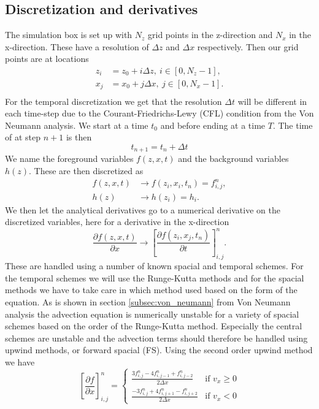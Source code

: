 \subsection{Discretization and derivatives}

The simulation box is set up with $N_z$ grid points in the z-direction and $N_x$ in the x-direction. These have a resolution of $\Delta z$ and $\Delta x$ respectively. Then our grid points are at locations
\begin{align*}
    z_i &= z_0 + i\Delta z,\ i\in[0,N_z-1], \\ 
    x_j &= x_0 + j\Delta x,\ j\in[0,N_x-1].\\ 
\end{align*}
For the temporal discretization we get that the resolution $\Delta t$ will be different in each time-step due to the Courant-Friedrichs-Lewy (CFL) condition from the Von Neumann analysis. We start at a time $t_0$ and before ending at a time $T$. The time of at step $n+1$ is then
\begin{equation*}
    t_{n+1} = t_n + \Delta t
\end{equation*}
We name the foreground variables $f(z,x,t)$ and the background variables $h(z)$. These are then discretized as
\begin{align*}
    f(z,x,t) &\rightarrow f(z_i, x_i, t_n) = f_{i,j}^n,\\
    h(z) &\rightarrow h(z_i) = h_i.
\end{align*}
We then let the analytical derivatives go to a numerical derivative on the discretized variables, here for a derivative in the x-direction
\begin{equation*}
    \frac{\partial f(z,x,t)}{\partial x}\rightarrow \left[\frac{\partial f(z_i,x_j,t_n)}{\partial t} \right]_{i,j}^n.
\end{equation*}
These are handled using a number of known spacial and temporal schemes. For the temporal schemes we will use the Runge-Kutta methods and for the spacial methods we have to take care in which method used based on the form of the equation. As is shown in section \ref{subsec:von_neumann} from Von Neumann analysis the advection equation is numerically unstable for a variety of spacial schemes based on the order of the Runge-Kutta method. Especially the central schemes are unstable and the advection terms should therefore be handled using upwind methods, or forward spacial (FS). Using the second order upwind method we have
\begin{equation}
    \left[\frac{\partial f}{\partial x} \right]_{i,j}^n= 
    \begin{cases} 
        \frac{3f_{i,j}^n-4f_{i,j-1}^n+f_{i,j-2}^n}{2\Delta x} & \text{if } v_x \geq 0 \\
        \frac{-3f_{i,j}^n+4f_{i,j+1}^n-f_{i,j+2}^n}{2\Delta x} & \text{if } v_x < 0 
    \end{cases}
\end{equation}

